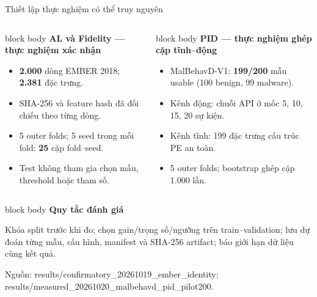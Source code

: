 \documentclass[aspectratio=169,10pt]{beamer}
\newcommand{\source}[1]{\vfill{\fontsize{5.7}{6.5}\selectfont\color{muted}Nguồn: #1}}
\newcommand{\smallbullet}{\setlength{\itemsep}{0.15em}\setlength{\parskip}{0pt}}
\newenvironment{bluebox}[1]{%
  \begin{beamercolorbox}[rounded=true,shadow=true,sep=0.18cm]{block body}%
  {\color{uetblue}\textbf{#1}}\par\vspace{0.08cm}\color{ink}%
}{\end{beamercolorbox}}
\begin{document}
\begin{frame}[t,shrink=6]{Thiết lập thực nghiệm có thể truy nguyên}
\begin{columns}[T,onlytextwidth]
\begin{bluebox}{AL và Fidelity — thực nghiệm xác nhận}
\small
\begin{itemize}\smallbullet
  \item \textbf{2.000} dòng EMBER 2018; \textbf{2.381} đặc trưng.
  \item SHA-256 và feature hash đã đối chiếu theo từng dòng.
  \item 5 outer folds; 5 seed trong mỗi fold: \textbf{25} cặp fold--seed.
  \item Test không tham gia chọn mẫu, threshold hoặc tham số.
\end{itemize}
\end{bluebox}

\begin{bluebox}{PID — thực nghiệm ghép cặp tĩnh--động}
\small
\begin{itemize}\smallbullet
  \item MalBehavD-V1: \textbf{199/200} mẫu usable (100 benign, 99 malware).
  \item Kênh động: chuỗi API ở mốc 5, 10, 15, 20 sự kiện.
  \item Kênh tĩnh: 199 đặc trưng cấu trúc PE an toàn.
  \item 5 outer folds; bootstrap ghép cặp 1.000 lần.
\end{itemize}
\end{bluebox}
\end{columns}

\vspace{0.33cm}
\begin{bluebox}{Quy tắc đánh giá}
Khóa split trước khi đo; chọn gain/trọng số/ngưỡng trên train--validation; lưu dự đoán từng mẫu, cấu hình, manifest và SHA-256 artifact; báo giới hạn dữ liệu cùng kết quả.
\end{bluebox}
\source{results/confirmatory\_20261019\_ember\_identity; results/measured\_20261020\_malbehavd\_pid\_pilot200.}
\end{frame}
\end{document}
